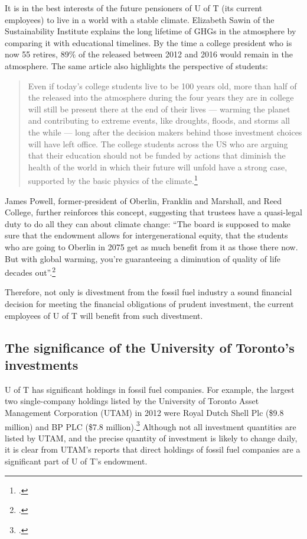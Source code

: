 \documentclass[10pt]{article}
\begin{document}
It is in the best interests of the future pensioners of U of T (its current employees) to live in a world with a stable climate.
Elizabeth Sawin of the Sustainability Institute explains the long lifetime of GHGs in the atmosphere by comparing it with educational timelines.
By the time a college president who is now 55 retires, 89\% of the  released between 2012 and 2016 would remain in the atmosphere.
The same article also highlights the perspective of students: 
\begin{quote}
Even if today's college students live to be 100 years old, more than half of the  released into the atmosphere during the four years they are in college will still be present there at the end of their lives --- warming the planet and contributing to extreme events, like droughts, floods, and storms all the while --- long after the decision makers behind those investment choices will have left office. The college students across the US who are arguing that their education should not be funded by actions that diminish the health of the world in which their future will unfold have a strong case, supported by the basic physics of the climate.\footcite{ClimateInteractivePersist}
\end{quote}
James Powell, former-president of Oberlin, Franklin and Marshall, and Reed College, further reinforces this concept, suggesting that trustees have a quasi-legal duty to do all they can about climate change: ``The board is supposed to make sure that the endowment allows for intergenerational equity, that the students who are going to Oberlin in 2075 get as much benefit from it as those there now. But with global warming, you're guaranteeing a diminution of quality of life decades out''.\footcite{CaseForDivestment}



Therefore, not only is divestment from the fossil fuel industry a sound financial decision for meeting the financial obligations of prudent investment, the current employees of U of T will benefit from such divestment.



		\subsection{The significance of the University of Toronto's investments}



U of T has significant holdings in fossil fuel companies.
For example, the largest two single-company holdings listed by the University of Toronto Asset Management Corporation (UTAM) in 2012 were Royal Dutch Shell Plc (\$9.8 million) and BP PLC (\$7.8 million).\footcite{UTAM_2012_Int}
Although not all investment quantities are listed by UTAM, and the precise quantity of investment is likely to change daily, it is clear from UTAM's reports that direct holdings of fossil fuel companies are a significant part of U of T's endowment.
\end{document}
